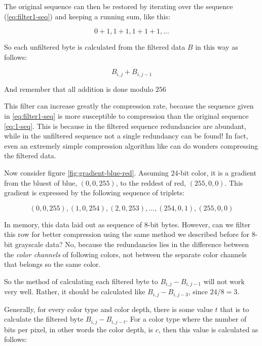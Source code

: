 The original sequence can then be restored by iterating over the
sequence (\ref{eq:filter1-seq}) and keeping a running sum, like this:

\begin{equation*}
  0+1,1+1,1+1+1,\dots
\end{equation*}

So each unfiltered byte is calculated from the filtered data $B$ in
this way as follows:

\begin{equation*}
  B_{i,j} + B_{i,j-1}
\end{equation*}

And remember that all addition is done modulo $256$

This filter can increase greatly the compression rate, because the
sequence given in \ref{eq:filter1-seq} is more susceptible to
compression than the original sequence \ref{eq:1-seq}. This is because
in the filtered sequence redundancies are abundant, while in the
unfiltered sequence not a single redundancy can be found! In fact,
even an extremely simple compression algorithm like \rle can do wonders
compressing the filtered data.

Now consider figure \ref{fig:gradient-blue-red}. Assuming 24-bit
color, it is a gradient from the bluest of blue, $(0,0,255)$, to the
reddest of red, $(255,0,0)$. This gradient is expressed by the
following sequence of \rgb triplets:

\begin{equation*}
  (0,0,255), (1,0,254), (2,0,253), \dots, (254,0,1), (255,0,0)
\end{equation*}

In memory, this data laid out as sequence of 8-bit bytes. However, can
we filter this row for better compression using the same method we
described before for 8-bit grayscale data? No, because the
redundancies lies in the difference between the \textit{color
  channels} of following colors, not between the separate color
channels that belongs so the same color.

So the method of calculating each filtered byte to $B_{i,j} -
B_{i,j-1}$ will not work very well. Rather, it should be calculated
like $B_{i,j} - B_{i,j-3}$, since $24 / 8 = 3$.

Generally, for every color type and color depth, there is some value $t$ that is to
calculate the filtered byte $B_{i,j} - B_{i,j-t}$. For a color type
where the number of bits per pixel, in other words the color depth, is
$c$, then this value is calculated as follows:

